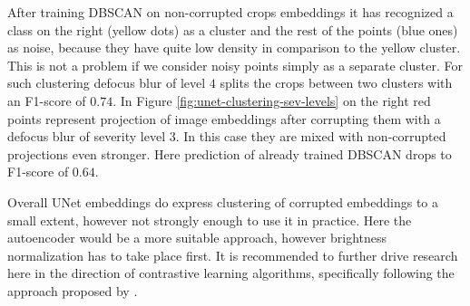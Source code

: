 After training DBSCAN on non-corrupted crops embeddings it has recognized a class on the right (yellow dots) as a cluster and the rest of the points (blue ones) as noise, because they have quite low density in comparison to the yellow cluster. This is not a problem if we consider noisy points simply as a separate cluster. For such clustering defocus blur of level $4$ splits the crops between two clusters with an F1-score of $0.74$. In Figure \ref{fig:unet-clustering-sev-levels} on the right red points represent projection of image embeddings after corrupting them with a defocus blur of severity level $3$. In this case they are mixed with non-corrupted projections even stronger. Here prediction of already trained DBSCAN drops to F1-score of $0.64$.

Overall UNet embeddings do express clustering of corrupted embeddings to a small extent, however not strongly enough to use it in practice. Here the autoencoder would be a more suitable approach, however brightness normalization has to take place first. It is recommended to further drive research here in the direction of contrastive learning algorithms, specifically following the approach proposed by \cite{csi}.